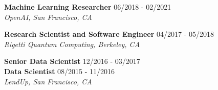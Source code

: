 \documentclass[10pt,centered]{./res} %
\begin{document}
\begin{resume}
{\bf Machine Learning Researcher} \hfill06/2018 - 02/2021 \\
{\it OpenAI, San Francisco, CA}

{\bf Research Scientist and Software Engineer} \hfill04/2017 - 05/2018 \\
{\it Rigetti Quantum Computing, Berkeley, CA}

{\bf Senior Data Scientist} \hfill12/2016 - 03/2017 \\
{\bf Data Scientist} \hfill08/2015 - 11/2016 \\
{\it LendUp, San Francisco, CA}


\end{resume}
\end{document}
